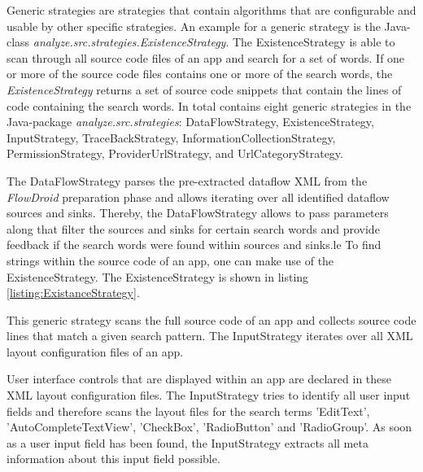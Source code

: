 Generic strategies are strategies that contain algorithms that are configurable and usable by other specific strategies.
An example for a generic strategy is the Java-class \textit{analyze.src.strategies.ExistenceStrategy}. 
The ExistenceStrategy is able to scan through all source code files of an app and search for a set of words.
If one or more of the source code files contains one or more of the search words, the \textit{ExistenceStrategy} returns a set of source code snippets that contain the lines of code containing the search words.
In total \AIPRAT contains eight generic strategies in the Java-package \textit{analyze.src.strategies}: DataFlowStrategy, ExistenceStrategy, InputStrategy, TraceBackStrategy, InformationCollectionStrategy, PermissionStrategy, ProviderUrlStrategy, and UrlCategoryStrategy.

The DataFlowStrategy parses the pre-extracted dataflow \acs{XML} from the \textit{FlowDroid} preparation phase and allows iterating over all identified dataflow sources and sinks.
Thereby, the DataFlowStrategy allows to pass parameters along that filter the sources and sinks for certain search words and provide feedback if the search words were found within sources and sinks.le
To find strings within the source code of an app, one can make use of the ExistenceStrategy.
The ExistenceStrategy is shown in listing \ref{listing:ExistanceStrategy}.
 
This generic strategy scans the full source code of an app and collects source code lines that match a given search pattern.
The InputStrategy iterates over all \acs{XML} layout configuration files of an app. 

User interface controls that are displayed within an app are declared in these \acs{XML} layout configuration files.
The InputStrategy tries to identify all user input fields and therefore scans the layout files for the search terms 'EditText', 'AutoCompleteTextView', 'CheckBox', 'RadioButton' and 'RadioGroup'.
As soon as a user input field has been found, the InputStrategy extracts all meta information about this input field possible.
